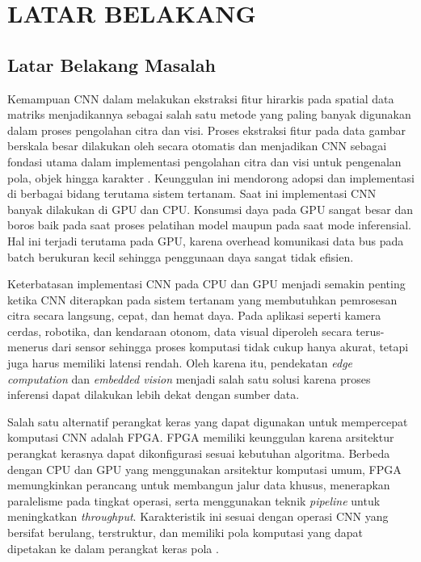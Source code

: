 \chapter{LATAR BELAKANG}

\section{Latar Belakang Masalah}
Kemampuan CNN dalam melakukan ekstraksi fitur hirarkis pada spatial
data matriks menjadikannya sebagai salah satu metode yang paling banyak
digunakan dalam proses pengolahan citra dan visi. Proses ekstraksi fitur
pada data gambar berskala besar dilakukan oleh secara otomatis dan
menjadikan CNN sebagai fondasi utama dalam implementasi pengolahan citra
dan visi untuk pengenalan pola, objek hingga karakter
\cite{Elharrouss2022BackbonesReviewFE,AlexNetPaper}. Keunggulan ini
mendorong adopsi dan implementasi di berbagai bidang terutama sistem tertanam.
Saat ini implementasi CNN banyak dilakukan di GPU dan CPU. Konsumsi daya pada GPU
sangat besar dan boros baik pada saat proses pelatihan model maupun pada saat mode inferensial\cite{GPUBOROS, GPUBATCHINFERENCE}.
Hal ini terjadi terutama pada GPU, karena overhead komunikasi data bus pada batch berukuran kecil sehingga penggunaan daya
sangat tidak efisien.

Keterbatasan implementasi CNN pada CPU dan GPU menjadi semakin
penting ketika CNN diterapkan pada sistem tertanam yang membutuhkan
pemrosesan citra secara langsung, cepat, dan hemat daya\cite{Grigorescu2020AutonomousDrivingSurvey}. Pada aplikasi
seperti kamera cerdas, robotika, dan kendaraan otonom, data visual
diperoleh secara terus-menerus dari sensor sehingga proses komputasi
tidak cukup hanya akurat, tetapi juga harus memiliki latensi rendah.
Oleh karena itu, pendekatan \emph{edge computation} dan
\emph{embedded vision} menjadi salah satu solusi karena proses
inferensi dapat dilakukan lebih dekat dengan sumber data.

Salah satu alternatif perangkat keras yang dapat digunakan untuk
mempercepat komputasi CNN adalah FPGA. FPGA memiliki keunggulan karena arsitektur perangkat
kerasnya dapat dikonfigurasi sesuai kebutuhan algoritma.
Berbeda dengan CPU dan GPU yang menggunakan arsitektur
komputasi umum, FPGA memungkinkan perancang untuk
membangun jalur data khusus, menerapkan paralelisme pada
tingkat operasi, serta menggunakan teknik \emph{pipeline} untuk
meningkatkan \emph{throughput}. Karakteristik ini sesuai dengan
operasi CNN yang bersifat berulang, terstruktur, dan memiliki
pola komputasi yang dapat dipetakan ke dalam perangkat keras pola
\cite{Guo2019FPGANNAcceleratorSurvey,Abdelouahab2018CNNFPGASurvey}.

